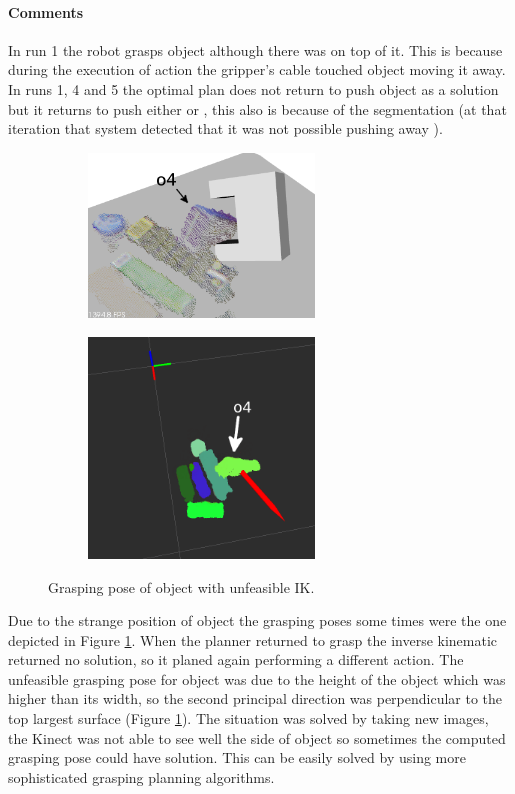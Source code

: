 \paragraph{Comments}
In run 1 the robot grasps object  although there was  on top of it. This is because during the execution of   action the gripper's cable touched object  moving it away.  In runs 1, 4 and 5 the optimal plan does not return to push object  as a solution but it returns to push either  or , this also is because of the segmentation (at that iteration that system detected that it was not possible pushing away ). 


\begin{figure}[tb]
\centering
\begin{subfigure}[t]{0.45\textwidth}
\centering
\includegraphics[width=6cm]{Img/experiments/exp_good/grasp_o4.png}
\end{subfigure}
\begin{subfigure}[t]{0.45\textwidth}
\centering
\includegraphics[width=6cm]{Img/experiments/exp_good/grasp_o4_rviz.png}
\end{subfigure}
\caption{Grasping pose of object  with unfeasible IK.}\label{fig:grasp_o4}
\end{figure}

Due to the strange position of object  the grasping poses some times were the one depicted in Figure \ref{fig:grasp_o4}. When the planner returned to grasp  the inverse kinematic returned no solution, so it planed again performing a different action. The unfeasible grasping pose for object  was due to the height of the object which was higher than its width, so the second principal direction was perpendicular to the top largest surface (Figure \ref{fig:grasp_o4}). The situation was solved by taking new images, the Kinect was not able to see well the side of object  so sometimes the computed grasping pose could have solution. This can be easily solved by using more sophisticated grasping planning algorithms. 

